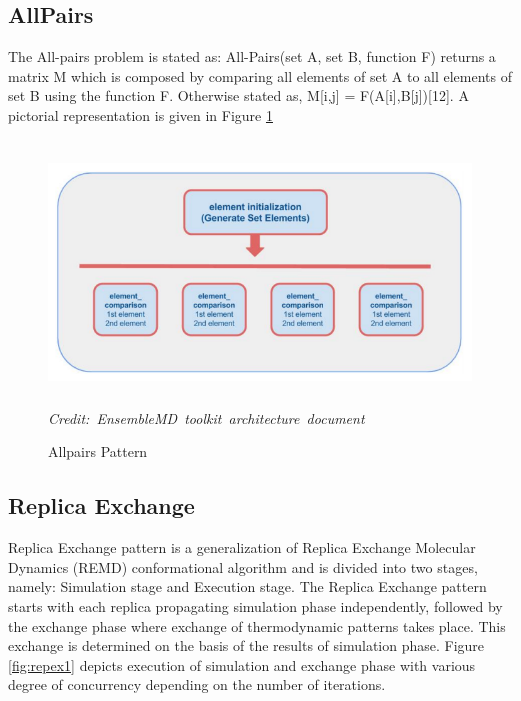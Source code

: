 \documentclass[10pt]{ruthesis}
\begin{document}
\subsection{AllPairs}
The All-pairs problem is stated as:
All-Pairs(set A, set B, function F) returns a matrix M which is composed by comparing all elements of set A to all elements of set B using the function F. Otherwise
stated as, M[i,j] = F(A[i],B[j])[12]. A pictorial representation is given in Figure \ref{fig:allpairs}
\begin{figure}
  \centering
  \includegraphics[width=13cm,height=7cm]{allpairs.png}
  \hbox{\small\itshape Credit: EnsembleMD toolkit architecture document \cite{site1}}
  \caption{Allpairs Pattern}
  \label{fig:allpairs}
\end{figure}

\subsection{Replica Exchange}

Replica Exchange pattern is a generalization of Replica Exchange Molecular Dynamics (REMD) conformational algorithm \cite{ref4} and is divided into two stages, namely: Simulation stage and Execution stage. The Replica Exchange pattern starts with each replica propagating simulation phase independently, followed by the exchange phase where exchange of thermodynamic patterns takes place. This exchange is determined on the basis of the results of simulation phase. Figure \ref{fig:repex1} \cite{site1} depicts execution of simulation and exchange phase with various degree of concurrency depending on the number of iterations.
\end{document}
